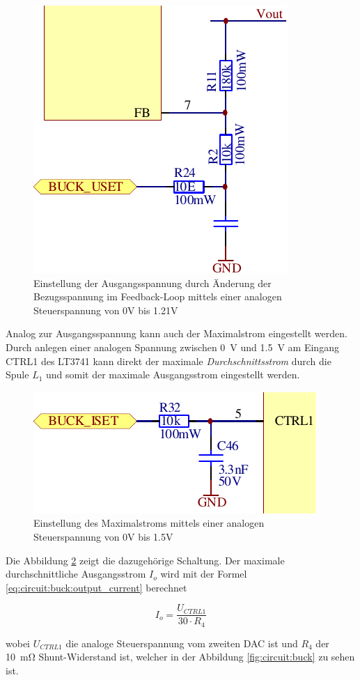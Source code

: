 \begin{figure}[th!]
    \center
    \includegraphics[width=.35\textwidth]{images/circuit/buck-uset.pdf}
    \caption{Einstellung der Ausgangsspannung durch \"Anderung der Bezugsspannung im Feedback-Loop mittels einer analogen Steuerspannung von 0V bis 1.21V}
    \label{fig:circuit:buck:uset}
\end{figure}

Analog zur Ausgangsspannung kann auch der Maximalstrom eingestellt werden. Durch
anlegen einer  analogen  Spannung  zwischen \SI{0}{\volt} und \SI{1.5}{\volt} am
Eingang  CTRL1 des LT3741 kann  direkt  der  maximale  \emph{Durchschnittsstrom}
durch die Spule $L_1$ und  somit  der maximale Ausgangsstrom eingestellt werden.

\begin{figure}[th!]
    \center
    \includegraphics[width=.4\textwidth]{images/circuit/buck-iset.pdf}
    \caption{Einstellung des Maximalstroms mittels einer analogen Steuerspannung von 0V bis 1.5V}
    \label{fig:circuit:buck:iset}
\end{figure}

Die Abbildung \ref{fig:circuit:buck:iset} zeigt  die  dazugeh\"orige  Schaltung.
Der   maximale  durchschnittliche  Ausgangsstrom  $I_o$  wird  mit  der   Formel
\ref{eq:circuit:buck:output_current} berechnet

\begin{equation}
    I_o = \frac{U_{CTRL1}}{30 \cdot R_4}
    \label{eq:circuit:buck:output_current}
\end{equation}

wobei $U_{CTRL1}$ die  analoge  Steuerspannung vom zweiten DAC ist und $R_4$ der
\SI{10}{\milli\ohm}    Shunt-Widerstand    ist,   welcher   in   der   Abbildung
\ref{fig:circuit:buck} zu sehen ist.


